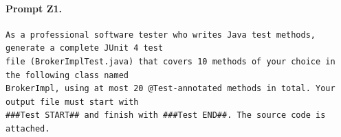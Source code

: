 
\paragraph*{Prompt Z1.}
\label{prompt:z1}
\begin{lstlisting}
As a professional software tester who writes Java test methods, generate a complete JUnit 4 test
file (BrokerImplTest.java) that covers 10 methods of your choice in the following class named
BrokerImpl, using at most 20 @Test-annotated methods in total. Your output file must start with
###Test START## and finish with ###Test END##. The source code is attached.
\end{lstlisting}

